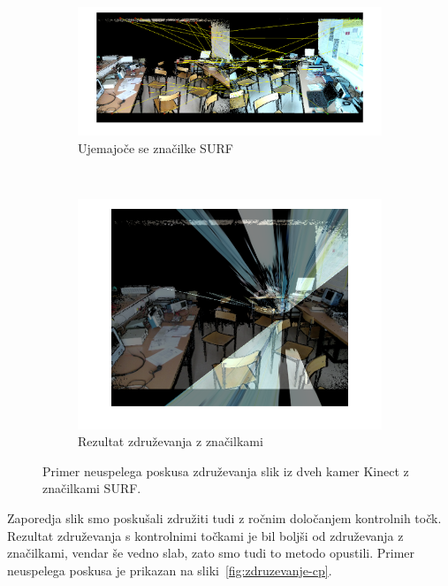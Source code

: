 \begin{figure}[!htb]
	\centering
	\begin{subfigure}[t]{0.45\columnwidth}
		\includegraphics[width=\columnwidth]{./Slike/matched-features.png}
		\caption{Ujemajoče se značilke SURF}
		\label{fig:zdruzevanje-surf}
	\end{subfigure}
	~
	\begin{subfigure}[t]{0.45\columnwidth}
		\includegraphics[width=\columnwidth]{./Slike/features-calibration-result.png}
		\caption{Rezultat združevanja z značilkami}
		\label{fig:zdruzevanje-result}
	\end{subfigure}
	\caption[Neuspelo združevanje slik z značilkami SURF]{Primer neuspelega poskusa združevanja slik iz dveh kamer Kinect z značilkami SURF.}
	\label{fig:zdruzevanje-znacilke}
\end{figure}

Zaporedja slik smo poskušali združiti tudi z ročnim določanjem kontrolnih točk. Rezultat {združevanja s kontrolnimi točkami} je bil boljši od združevanja z značilkami, vendar še vedno slab, zato smo tudi to metodo opustili. Primer neuspelega poskusa je prikazan na sliki~\ref{fig:zdruzevanje-cp}.

